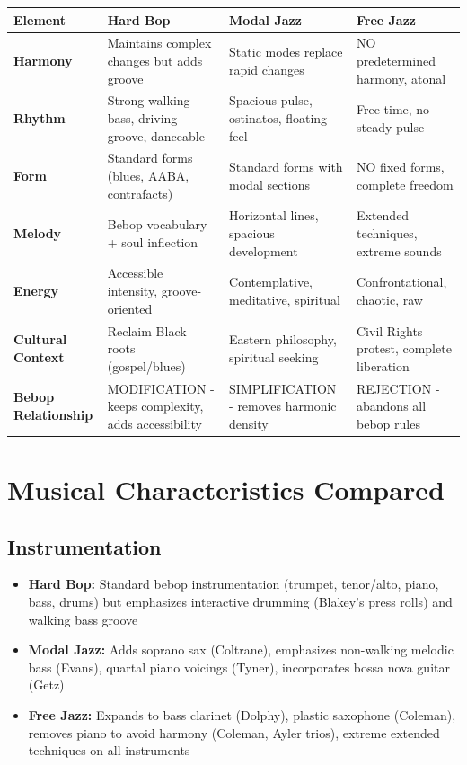 \documentclass[11pt]{article}
\begin{document}
\begin{tabular}{|p{2.5cm}|p{3cm}|p{3cm}|p{3cm}|}
\hline
\textbf{Element} & \textbf{Hard Bop} & \textbf{Modal Jazz} & \textbf{Free Jazz} \\
\hline
\textbf{Harmony} & Maintains complex changes but adds groove & Static modes replace rapid changes & NO predetermined harmony, atonal \\
\hline
\textbf{Rhythm} & Strong walking bass, driving groove, danceable & Spacious pulse, ostinatos, floating feel & Free time, no steady pulse \\
\hline
\textbf{Form} & Standard forms (blues, AABA, contrafacts) & Standard forms with modal sections & NO fixed forms, complete freedom \\
\hline
\textbf{Melody} & Bebop vocabulary + soul inflection & Horizontal lines, spacious development & Extended techniques, extreme sounds \\
\hline
\textbf{Energy} & Accessible intensity, groove-oriented & Contemplative, meditative, spiritual & Confrontational, chaotic, raw \\
\hline
\textbf{Cultural Context} & Reclaim Black roots (gospel/blues) & Eastern philosophy, spiritual seeking & Civil Rights protest, complete liberation \\
\hline
\textbf{Bebop Relationship} & MODIFICATION - keeps complexity, adds accessibility & SIMPLIFICATION - removes harmonic density & REJECTION - abandons all bebop rules \\
\hline
\end{tabular}

\section*{Musical Characteristics Compared}

\subsection*{Instrumentation}
\begin{itemize}[leftmargin=*, itemsep=0.2em]
\item \textbf{Hard Bop:} Standard bebop instrumentation (trumpet, tenor/alto, piano, bass, drums) but emphasizes interactive drumming (Blakey's press rolls) and walking bass groove
\item \textbf{Modal Jazz:} Adds soprano sax (Coltrane), emphasizes non-walking melodic bass (Evans), quartal piano voicings (Tyner), incorporates bossa nova guitar (Getz)
\item \textbf{Free Jazz:} Expands to bass clarinet (Dolphy), plastic saxophone (Coleman), removes piano to avoid harmony (Coleman, Ayler trios), extreme extended techniques on all instruments
\end{itemize}
\end{document}

